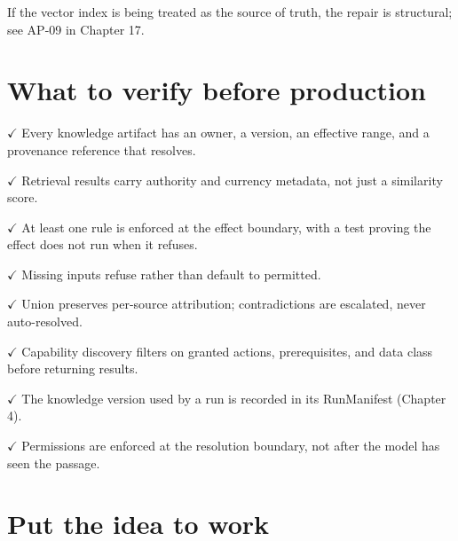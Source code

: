 If the vector index is being treated as the source of truth, the repair is structural; see AP-09 in Chapter 17.\par

\section{What to verify before production}

\textbf{\ensuremath{\checkmark}} Every knowledge artifact has an owner, a version, an effective range, and a provenance reference that resolves.\par

\textbf{\ensuremath{\checkmark}} Retrieval results carry authority and currency metadata, not just a similarity score.\par

\textbf{\ensuremath{\checkmark}} At least one rule is enforced at the effect boundary, with a test proving the effect does not run when it refuses.\par

\textbf{\ensuremath{\checkmark}} Missing inputs refuse rather than default to permitted.\par

\textbf{\ensuremath{\checkmark}} Union preserves per-source attribution; contradictions are escalated, never auto-resolved.\par

\textbf{\ensuremath{\checkmark}} Capability discovery filters on granted actions, prerequisites, and data class before returning results.\par

\textbf{\ensuremath{\checkmark}} The knowledge version used by a run is recorded in its RunManifest (Chapter 4).\par

\textbf{\ensuremath{\checkmark}} Permissions are enforced at the resolution boundary, not after the model has seen the passage.\par

\section{Put the idea to work}

